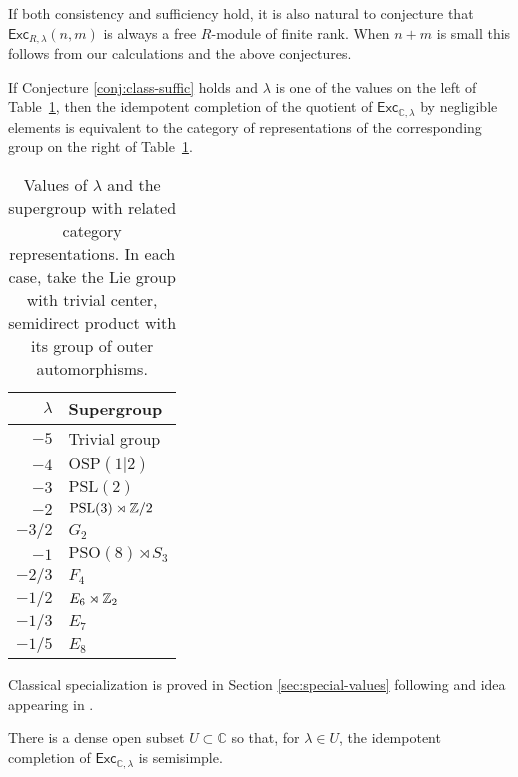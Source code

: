 \documentclass[12pt]{amsart}
\begin{document}
If both consistency and sufficiency hold, it is also natural to conjecture
that $\mathsf{Exc}_{R,\lambda}(n,m)$ is always a free $R$-module of finite
rank.  When $n+m$ is small this follows from our calculations and the above
conjectures.

\begin{proposition}
If Conjecture \ref{conj:class-suffic} holds and $\lambda$ is one of
the values on the left of Table~\ref{tab:lambda-group}, then the
idempotent completion of the quotient of
$\mathsf{Exc}_{\mathbb{C},\lambda}$ by negligible elements is equivalent
to the category of representations of the corresponding group on the
right of Table~\ref{tab:lambda-group}.
\end{proposition}

\begin{table}
  \begin{tabular}{rl}
    \toprule
    $\lambda$ & Supergroup \\ \midrule
    $-5$ & Trivial group \\
    $-4$ & $\mathrm{OSP}(1|2)$ \\
    $-3$ & $\mathrm{PSL}(2)$ \\
    $-2$ & $\mathrm{PSL}(3) \rtimes \mathbb Z/2$ \\
    $-3/2$ & $G_2$ \\
    $-1$ & $\mathrm{PSO}(8) \rtimes S_3$ \\
    $-2/3$ & $F_4$ \\
    $-1/2$ & $E_6 \rtimes \mathbb Z_2$ \\
    $-1/3$ & $E_7$ \\
    $-1/5$ & $E_8$ \\
    \bottomrule
  \end{tabular}
  \caption{Values of $\lambda$ and the supergroup with related category
    representations. In each case, take the Lie group
    with trivial center, semidirect product with its group of outer
    automorphisms.}
  \label{tab:lambda-group}
\end{table}

Classical specialization is proved in Section \ref{sec:special-values} following
and idea appearing in \cite{1709.01278}.


\begin{conjecture}
There is a dense open subset $U \subset \mathbb{C}$ so that, for
$\lambda \in U$, the idempotent
completion of $\mathsf{Exc}_{\mathbb{C},\lambda}$ is
semisimple.
\end{conjecture}
\end{document}
